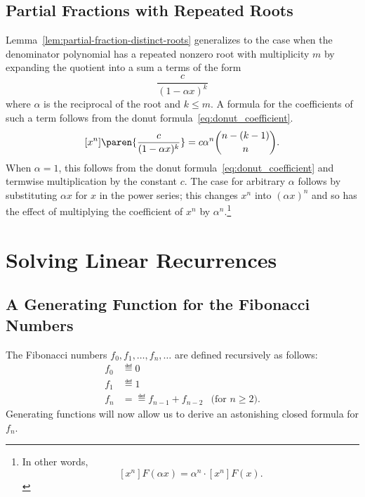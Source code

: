 \subsection{Partial Fractions with Repeated Roots}
Lemma~\ref{lem:partial-fraction-distinct-roots} generalizes to the
case when the denominator polynomial has a repeated nonzero root with
multiplicity $m$ by expanding the quotient into a sum a terms of the form
\[
\frac{c}{(1-\alpha x)^k}
\]
where $\alpha$ is the reciprocal of the root and $k \leq m$.
A formula for the coefficients of such a term follows
from the donut formula~\eqref{eq:donut_coefficient}.
\begin{equation}\label{c-alpha-k-coeff}
[x^n]\paren{\frac{c}{(1-\alpha x)^k}} = c \alpha^n \binom{n-(k-1)}{n}.
\end{equation}
When $\alpha = 1$, this follows from the donut
formula~\eqref{eq:donut_coefficient} and termwise multiplication by
the constant $c$.  The case for arbitrary $\alpha$ follows by
substituting $\alpha x$ for $x$ in the power series; this changes $x^n$ into
$(\alpha x)^n$ and so has the effect of multiplying the coefficient of
$x^n$ by $\alpha^n$.\footnote{In other words,
\[
[x^n]F(\alpha x) = \alpha^n \cdot [x^n]F(x).
\]}

\begin{problems}

\classproblems
{}

\homeworkproblems
{}

\examproblems
{}
\end{problems}

\section{Solving Linear Recurrences}\label{sec:fibonacci}

\subsection{A Generating Function for the Fibonacci Numbers}

The Fibonacci numbers $f_0,f_1,\dots,f_n,\dots$ are defined recursively
as follows:
\begin{align*}
f_0 & \eqdef 0 \\
f_1 & \eqdef 1 \\
f_n & =\eqdef f_{n-1} + f_{n-2}
   & \text{(for $n \geq 2$)}.
\end{align*}
Generating functions will now allow us to derive an astonishing closed formula for $f_n$.

